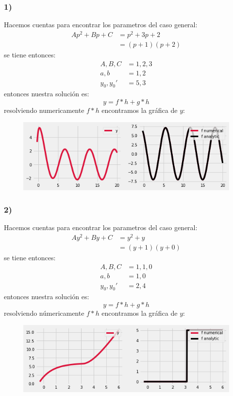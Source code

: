 \documentclass{article}
\begin{document}
\begin{tcolorbox}
    \subsubsection*{1)}
    Hacemos cuentas para encontrar los parametros del caso general:
    \begin{align*}
        Ap^2 + Bp + C 
        &= p^2 + 3p + 2 \\
        &= (p+1)(p+2) 
    \end{align*}
    se tiene entonces:
    \begin{align*}
        A, B, C &= 1, 2, 3 \\ 
        a, b &= 1, 2 \\
        y_0, y_0' &= 5, 3
    \end{align*}
    entonces nuestra solución es:
    \[ y = f*h + g*h \]
    resolviendo numericamente $f*h$ encontramos la gráfica de $y$:
    \begin{figure}[H]
        \centering
        \includegraphics[scale=0.7]{images/p1_1.png}
    \end{figure}

    \subsubsection*{2)}
    Hacemos cuentas para encontrar los parametros del caso general:
    \begin{align*}
        Ay^2 + By + C 
        &= y^2 + y \\
        &= (y+1)(y+0)
    \end{align*}
    se tiene entonces:
    \begin{align*}
        A, B, C &= 1,1,0 \\ 
        a,b &= 1,0 \\
        y_0, y_0' &= 2, 4
    \end{align*}
    entonces nuestra solución es:
    \[ y = f*h + g*h \]
    resolviendo númericamente $f*h$ encontramos la gráfica de $y$:
    \begin{figure}[H]
        \centering
        \includegraphics[scale=0.7]{images/p1_2.png}
    \end{figure}
\end{tcolorbox}
\end{document}
